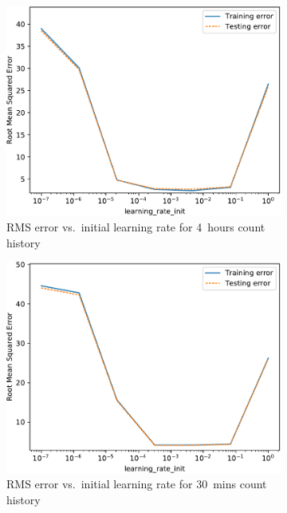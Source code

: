 \begin{figure}[!ht]
\begin{subfigure}[t]{.47\linewidth}
        \includegraphics[width=0.9\linewidth]{./figures/AplotB3.pdf}
        \caption{RMS error vs.~initial learning rate for 4~hours count history}\label{AppAplotB3}
    \end{subfigure}\hfill%
    \begin{subfigure}[t]{.47\linewidth}\centering
        \includegraphics[width=0.9\linewidth]{./figures/AplotB4.pdf}
        \caption{RMS error vs.~initial learning rate for 30~mins count history}\label{AppAplotB4}
    \end{subfigure}\\[5pt]
    \begin{subfigure}[t]{.47\linewidth}\centering

\end{subfigure}
\end{figure}
